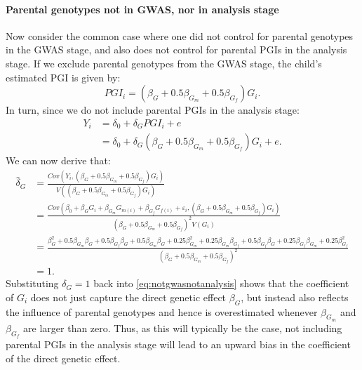 \documentclass[12pt,a4paper]{article}
\begin{document}
\begin{bibunit}
\paragraph{Parental genotypes not in GWAS, nor in analysis stage}
Now consider the common case where one did not control for parental genotypes in the GWAS stage, and also does not control for parental PGIs in the analysis stage. If we exclude parental genotypes from the GWAS stage, the child's estimated PGI is given by: 
\begin{equation} \label{eq:pginogwas}
    PGI_i = \left(\beta_G + 0.5 \beta_{G_m} + 0.5 \beta_{G_f} \right) G_i.
\end{equation}
In turn, since we do not include parental PGIs in the analysis stage:
\begin{align} \label{eq:notgwasnotanalysis}
 Y_i &= \delta_0 + \delta_G PGI_i + e \nonumber\\
  &= \delta_0 + \delta_G \left(\beta_G + 0.5 \beta_{G_m} + 0.5 \beta_{G_f} \right) G_i + e.
\end{align}
We can now derive that:
\begin{align}
 \hat{\delta}_G &= \frac{Cov(Y_i,\left(\beta_G + 0.5 \beta_{G_m} + 0.5 \beta_{G_f} \right) G_i)}{V(\left(\beta_G + 0.5 \beta_{G_m} + 0.5 \beta_{G_f} \right) G_i)} \nonumber\\
 &= \frac{Cov(\beta_0 + \beta_G G_i + \beta_{G_m} G_{m(i)} + \beta_{G_f} G_{f(i)} + \varepsilon_i,\left(\beta_G + 0.5 \beta_{G_m} + 0.5 \beta_{G_f} \right) G_i)}{\left(\beta_G + 0.5 \beta_{G_m} + 0.5 \beta_{G_f} \right)^2 V(G_i)} \nonumber\\
 &= \frac{\scriptstyle \beta_G^2 {+} 0.5 \beta_{G_m} \beta_G {+} 0.5 \beta_{G_f} \beta_G {+} 0.5\beta_{G_m} \beta_G {+} 0.25 \beta_{G_m}^2 {+} 0.25 \beta_{G_m} \beta_{G_f} {+} 0.5 \beta_{G_f} \beta_G {+} 0.25 \beta_{G_f} \beta_{G_m} {+} 0.25 \beta_{G_f}^2}{\left(\beta_G + 0.5 \beta_{G_m} + 0.5 \beta_{G_f} \right)^2} \nonumber\\
 &= 1.
\end{align}
Substituting $\delta_G=1$ back into \autoref{eq:notgwasnotanalysis} shows that the coefficient of $G_i$ does not just capture the direct genetic effect $\beta_G$, but instead also reflects the influence of parental genotypes and hence is overestimated whenever $\beta_{G_m}$ and $\beta_{G_f}$ are larger than zero. Thus, as this will typically be the case, not including parental PGIs in the analysis stage will lead to an upward bias in the coefficient of the direct genetic effect.


\end{bibunit}
\end{document}
